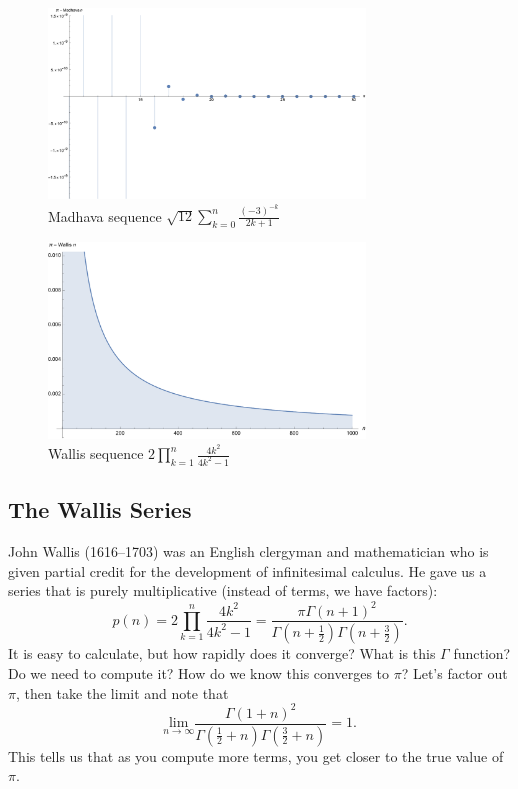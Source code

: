 \begin{figure}[p]
  \centerline{\includegraphics[width=0.75\textwidth]{figures/Madhava.pdf}}
  \caption{Madhava sequence $\sqrt{12} \sum _{k=0}^n \frac{(-3)^{-k}}{2 k+1}$}
\end{figure}

\begin{figure}[p]
  \centerline{\includegraphics[width=0.75\textwidth]{figures/Wallis.pdf}}
  \caption{Wallis sequence $2 \prod _{k=1}^n \frac{4 k^2}{4 k^2-1}$}
\end{figure}

\subsection{The Wallis Series}

John Wallis (1616--1703) was an English clergyman and mathematician who
is given partial credit for the development of infinitesimal calculus.
He gave us a series that is purely multiplicative (instead of terms, we
have factors):
$$
p(n)=2 \prod _{k=1}^n \frac{4 k^2}{4 k^2-1} = \frac{\pi  \Gamma (n+1)^2}{\Gamma \left(n+\frac{1}{2}\right) \Gamma
   \left(n+\frac{3}{2}\right)}.
$$
It is easy to calculate, but how rapidly does it converge? What is this $\Gamma$ function?
Do we need to compute it?
How do we know this converges to $\pi$?
Let's factor out $\pi$, then take the limit and note that
$$
\underset{n\to \infty }{\text{lim}}\frac{\Gamma (1+n)^2}{\Gamma
   \left(\frac{1}{2}+n\right) \Gamma \left(\frac{3}{2}+n\right)} = 1.
$$
This tells us that as you compute more terms, you get closer to the true value of $\pi$.

